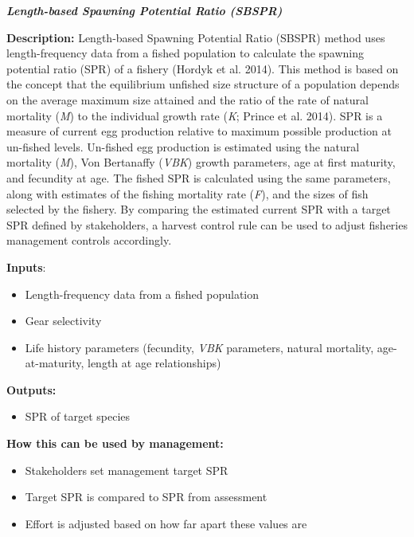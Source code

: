 \documentclass[]{book}
\providecommand{\tightlist}{%
  \setlength{\itemsep}{0pt}\setlength{\parskip}{0pt}}
\begin{document}
\textbf{\emph{Length-based Spawning Potential Ratio (SBSPR)}}

\textbf{Description:} Length-based Spawning Potential Ratio (SBSPR)
method uses length-frequency data from a fished population to calculate
the spawning potential ratio (SPR) of a fishery (Hordyk et al. 2014).
This method is based on the concept that the equilibrium unfished size
structure of a population depends on the average maximum size attained
and the ratio of the rate of natural mortality (\emph{M}) to the
individual growth rate (\emph{K}; Prince et al. 2014). SPR is a measure
of current egg production relative to maximum possible production at
un-fished levels. Un-fished egg production is estimated using the
natural mortality (\emph{M}), Von Bertanaffy (\emph{VBK}) growth
parameters, age at first maturity, and fecundity at age. The fished SPR
is calculated using the same parameters, along with estimates of the
fishing mortality rate (\emph{F}), and the sizes of fish selected by the
fishery. By comparing the estimated current SPR with a target SPR
defined by stakeholders, a harvest control rule can be used to adjust
fisheries management controls accordingly.

\textbf{Inputs}:

\begin{itemize}
\tightlist
\item
  Length-frequency data from a fished population
\end{itemize}

\begin{itemize}
\item
  Gear selectivity
\item
  Life history parameters (fecundity, \emph{VBK} parameters, natural
  mortality, age-at-maturity, length at age relationships)
\end{itemize}

\textbf{Outputs:}

\begin{itemize}
\tightlist
\item
  SPR of target species
\end{itemize}

\textbf{How this can be used by management: }

\begin{itemize}
\item
  Stakeholders set management target SPR
\item
  Target SPR is compared to SPR from assessment
\item
  Effort is adjusted based on how far apart these values are
\end{itemize}
\end{document}
